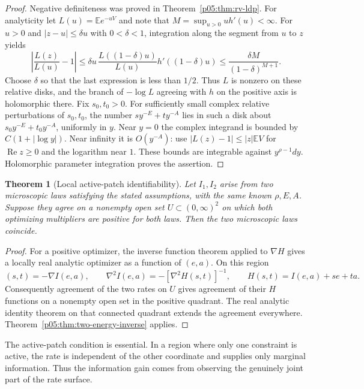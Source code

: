 \documentclass[11pt,letterpaper]{article}
\newtheorem{theorem}{Theorem}[section]
\theoremstyle{definition}
\theoremstyle{remark}
\renewcommand{\Re}{\operatorname{Re}}
\newcommand{\1}{\mathbf 1}
\begin{document}
\begin{proof}
Negative definiteness was proved in Theorem~\ref{p05:thm:rv-ldp}.
For analyticity let $L(u)=\mathbb E e^{-uV}$ and note that
$M=\sup_{u>0}u h'(u)<\infty$.
For $u>0$ and $|z-u|\le\delta u$ with $0<\delta<1$, integration along
the segment from $u$ to $z$ yields
\[
 \left|\frac{L(z)}{L(u)}-1\right|
 \le\delta u\,\frac{L((1-\delta)u)}{L(u)}h'((1-\delta)u)
 \le\frac{\delta M}{(1-\delta)^{M+1}}.
\]
Choose $\delta$ so that the last expression is less than $1/2$.
Thus $L$ is nonzero on these relative disks, and the branch of
$-\log L$ agreeing with $h$ on the positive axis is holomorphic there.
Fix $s_0,t_0>0$. For sufficiently small complex relative perturbations
of $s_0,t_0$, the number $sy^{-E}+ty^{-A}$ lies in such a disk about
$s_0y^{-E}+t_0y^{-A}$, uniformly in $y$.
Near $y=0$ the complex integrand is bounded by
$C(1+|\log y|)$. Near infinity it is $O(y^{-A})$: use
$|L(z)-1|\le |z|\mathbb EV$ for $\Re z\ge0$ and the logarithm near
$1$. These bounds are integrable against $y^{\rho-1}dy$.
Holomorphic parameter integration proves the assertion.
\end{proof}

\begin{theorem}[Local active-patch identifiability]
\label{p05:thm:local-inverse}
Let $I_1,I_2$ arise from two microscopic laws satisfying the stated
assumptions, with the same known $\rho,E,A$.
Suppose they agree on a nonempty open set $U\subset(0,\infty)^2$
on which both optimizing multipliers are positive for both laws.
Then the two microscopic laws coincide.
\end{theorem}

\begin{proof}
For a positive optimizer, the inverse function theorem applied to
$\nabla H$ gives a locally real analytic optimizer as a function of
$(e,a)$. On this region
\[
 (s,t)=-\nabla I(e,a),\qquad
 \nabla^2 I(e,a)=-[\nabla^2 H(s,t)]^{-1},\qquad
 H(s,t)=I(e,a)+se+ta.
\]
Consequently agreement of the two rates on $U$ gives agreement of
their $H$ functions on a nonempty open set in the positive quadrant.
The real analytic identity theorem on that connected quadrant extends
the agreement everywhere. Theorem~\ref{p05:thm:two-energy-inverse} applies.
\end{proof}

The active-patch condition is essential. In a region where only one
constraint is active, the rate is independent of the other coordinate
and supplies only marginal information. Thus the information gain
comes from observing the genuinely joint part of the rate surface.
\end{document}
